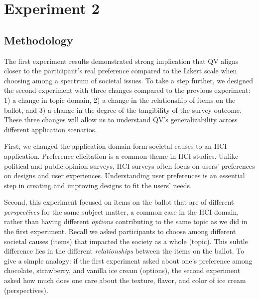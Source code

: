 \section{Experiment 2}
\subsection{Methodology} \label{method-2}


The first experiment results demonstrated strong implication that QV aligns closer to the participant's real preference compared to the Likert scale when choosing among a spectrum of societal issues. To take a step further, we designed the second experiment with three changes compared to the previous experiment: 1) a change in topic domain, 2) a change in the relationship of items on the ballot, and 3) a change in the degree of the tangibility of the survey outcome. These three changes will allow us to understand QV's generalizability across different application scenarios. 

First, we changed the application domain form societal causes to an HCI application. Preference elicitation is a common theme in HCI studies. Unlike political and public-opinion surveys, HCI surveys often focus on users' preferences on designs and user experiences. Understanding user preferences is an essential step in creating and improving designs to fit the users' needs. 

Second, this experiment focused on items on the ballot that are of different \textit{perspectives} for the same subject matter, a common case in the HCI domain, rather than having different \textit{options} contributing to the same topic as we did in the first experiment. Recall we asked participants to choose among different societal causes (items) that impacted the society as a whole (topic). This subtle difference lies in the different \textit{relationships} between the items on the ballot. To give a simple analogy: if the first experiment asked about one's preference among chocolate, strawberry, and vanilla ice cream (options), the second experiment asked how much does one care about the texture, flavor, and color of ice cream (perspectives). 

